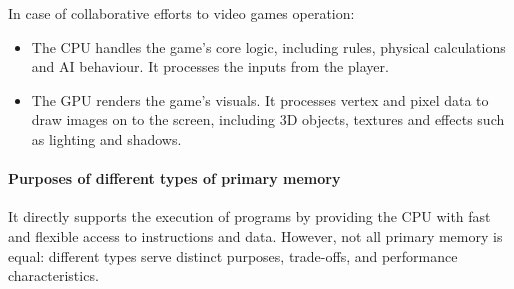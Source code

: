 In case of collaborative efforts to video games operation:
\begin{itemize}
	\item The CPU handles the game’s core logic, including rules, physical calculations and AI behaviour. It processes the inputs from the player.
	\item The GPU renders the game’s visuals. It processes vertex and pixel data to draw images on to the screen, including 3D objects, textures and effects such as lighting and shadows. 
\end{itemize}
\paragraph{Purposes of different types of primary memory}
It directly supports the execution of programs by providing the CPU with fast and flexible access to instructions and data. However, not all primary memory is equal: different types serve distinct purposes, trade-offs, and performance characteristics.
